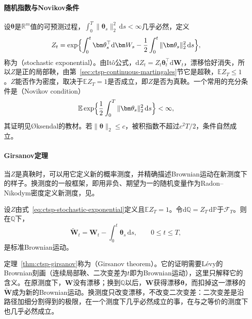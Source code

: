 \paragraph{随机指数与Novikov条件}
设$\bm\theta$是$\mathbb R^m$值的可预测过程，$\int_0^T\|\bm\theta_s\|_2^2\,\mathrm ds<\infty$几乎必然，定义
\begin{equation}
  Z_t=\exp\Bigl\{\int_0^t\bm\theta_s^\top\mathrm d\bm W_s-\frac12\int_0^t\|\bm\theta_s\|_2^2\,\mathrm ds\Bigr\},
  \label{eq:ctsp-stochastic-exponential}
\end{equation}
称为（stochastic exponential）。由Itô公式，$\mathrm dZ_t=Z_t\bm\theta_t^\top\mathrm d\bm W_t$，漂移恰好消失，所以$Z$是正的局部鞅，由第~\ref{sec:ctsp-continuous-martingales}节它是超鞅，$\mathbb EZ_T\leq1$。$Z$能否作为密度，取决于$\mathbb EZ_T=1$是否成立，即$Z$是否为真鞅。一个常用的充分条件是（Novikov condition）
\begin{equation}
  \mathbb E\exp\Bigl\{\frac12\int_0^T\|\bm\theta_s\|_2^2\,\mathrm ds\Bigr\}<\infty ,
  \label{eq:ctsp-novikov}
\end{equation}
其证明见Øksendal的教材。若$\|\bm\theta\|_2\leq c$，被积指数不超过$c^2T/2$，条件自然成立。

\paragraph{Girsanov定理}
当$Z$是真鞅时，可以用它定义新的概率测度，并精确描述Brownian运动在新测度下的样子。换测度的一般框架，即用非负、期望为一的随机变量作为Radon--Nikodym密度定义新测度，见。

\begin{theorem}[Girsanov定理]
  \label{thm:ctsp-girsanov}
  设$Z$由式~\eqref{eq:ctsp-stochastic-exponential}定义且$\mathbb EZ_T=1$。令$\mathrm d\mathbb Q=Z_T\,\mathrm d\mathbb P$于$\mathcal F_T$。则在$\mathbb Q$下，
  \[
    \widetilde{\bm W}_t=\bm W_t-\int_0^t\bm\theta_s\,\mathrm ds,\qquad0\leq t\leq T,
  \]
  是标准Brownian运动。
\end{theorem}

定理~\ref{thm:ctsp-girsanov}称为（Girsanov theorem）。它的证明需要Lévy的Brownian刻画（连续局部鞅、二次变差为$t$即为Brownian运动），这里只解释它的含义。在原测度下，$\bm W$没有漂移；换到$\mathbb Q$以后，$\bm W$获得漂移$\bm\theta$，而扣掉这一漂移的$\widetilde{\bm W}$成为新的Brownian运动。换测度只改变漂移，不改变二次变差：二次变差是沿路径加细分割得到的极限，在一个测度下几乎必然成立的事，在与之等价的测度下也几乎必然成立。

